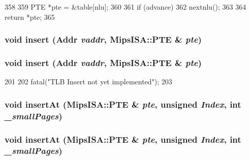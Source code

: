 \begin{DoxyCode}
358 {
359     PTE *pte = &table[nlu];
360 
361     if (advance)
362         nextnlu();
363 
364     return *pte;
365 }
\end{DoxyCode}
\hypertarget{classMipsISA_1_1TLB_a3e394e68b30bef38db30203d2e4324d8}{
\subsubsection[{insert}]{\setlength{\rightskip}{0pt plus 5cm}void insert ({\bf Addr} {\em vaddr}, \/  {\bf MipsISA::PTE} \& {\em pte})}}
\label{classMipsISA_1_1TLB_a3e394e68b30bef38db30203d2e4324d8}
\hypertarget{classMipsISA_1_1TLB_a3e394e68b30bef38db30203d2e4324d8}{
\subsubsection[{insert}]{\setlength{\rightskip}{0pt plus 5cm}void insert ({\bf Addr} {\em vaddr}, \/  {\bf MipsISA::PTE} \& {\em pte})}}
\label{classMipsISA_1_1TLB_a3e394e68b30bef38db30203d2e4324d8}



\begin{DoxyCode}
201 {
202     fatal("TLB Insert not yet implemented\n");
203 }
\end{DoxyCode}
\hypertarget{classMipsISA_1_1TLB_ac8f8f13ac6850d331b331f6ed7fed5c8}{
\subsubsection[{insertAt}]{\setlength{\rightskip}{0pt plus 5cm}void insertAt ({\bf MipsISA::PTE} \& {\em pte}, \/  unsigned {\em Index}, \/  int {\em \_\-smallPages})}}
\label{classMipsISA_1_1TLB_ac8f8f13ac6850d331b331f6ed7fed5c8}
\hypertarget{classMipsISA_1_1TLB_ac8f8f13ac6850d331b331f6ed7fed5c8}{
\subsubsection[{insertAt}]{\setlength{\rightskip}{0pt plus 5cm}void insertAt ({\bf MipsISA::PTE} \& {\em pte}, \/  unsigned {\em Index}, \/  int {\em \_\-smallPages})}}
\label{classMipsISA_1_1TLB_ac8f8f13ac6850d331b331f6ed7fed5c8}



